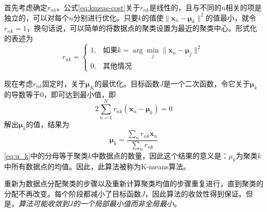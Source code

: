\documentclass[11pt]{ctexbook}
\begin{document}
首先考虑确定$r_{nk}$。公式\ref{eq:kmeas-cost}关于$r_{nk}$是线性的，且与不同的$n$相关的项是独立的，可以对每个$n$分别进行优化。只要$k$的值使$\|\bm x_n-\bm \mu_k\|^2$的值最小，就令$r_{nk}=1$，换句话说，可以简单的将数据点的聚类设置为最近的聚类中心。形式化的表述为
\begin{equation}
	r_{nk} = \left\{\begin{array}{ll}
		1, & \text{如果} k = \arg\min_{j} \| \bm x_n - \bm \mu_j\|^2 \\
		0, & \text{其他情况}
	\end{array}\right.
\end{equation}

现在考虑$r_{nk}$固定时，关于$\bm \mu_K$的最优化。目标函数$J$是一个二次函数，令它关于$\bm \mu_k$的导数等于$0$，即可达到最小值，即
\begin{equation}
	2\sum_{n=1}^{N}r_{nk}(\bm x_n - \bm \mu_k) = 0
\end{equation}
解出$\bm \mu_k$的值，结果为
\begin{equation}
	\label{eq:u_k}
	\bm \mu_k = \frac{\sum_n r_{nk}\bm x_n}{\sum_n r_{nk}}
\end{equation}
\ref{eq:u_k}中的分母等于聚类$k$中数据点的数量，因此这个结果的意义是：$\mu_k$为聚类$k$中所有数据点的均值。因此，此算法被称为K-means算法。

重新为数据点分配聚类的步骤以及重新计算聚类均值的步骤重复进行，直到聚类的分配不再改变。每个阶段都减小了目标函数$J$，因此算法的收敛性得到保证。但是，\emph{算法可能收敛到$J$的一个局部最小值而非全局最小}。
\end{document}
